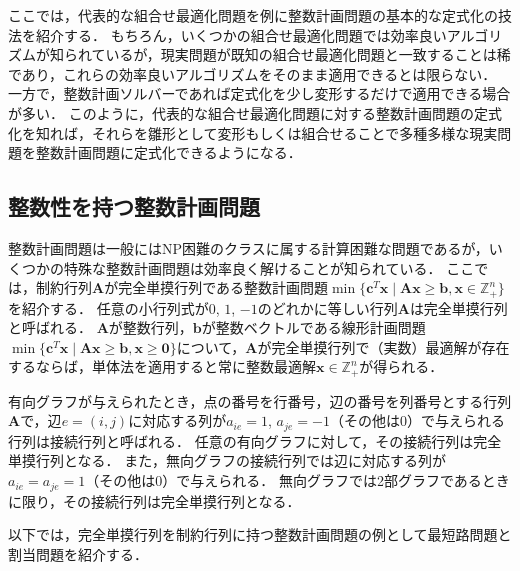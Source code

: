 \documentclass[japanese]{jnlp_1.4}
\begin{document}
ここでは，代表的な組合せ最適化問題を例に整数計画問題の基本的な定式化の技法を紹介する．
もちろん，いくつかの組合せ最適化問題では効率良いアルゴリズムが知られているが，現実問題が既知の組合せ最適化問題と一致することは稀であり，これらの効率良いアルゴリズムをそのまま適用できるとは限らない．
一方で，整数計画ソルバーであれば定式化を少し変形するだけで適用できる場合が多い．
このように，代表的な組合せ最適化問題に対する整数計画問題の定式化を知れば，それらを雛形として変形もしくは組合せることで多種多様な現実問題を整数計画問題に定式化できるようになる．


\subsection{整数性を持つ整数計画問題}
\label{sec:unimodular}

整数計画問題は一般にはNP困難のクラスに属する計算困難な問題であるが，いくつかの特殊な整数計画問題は効率良く解けることが知られている．
ここでは，制約行列$\bm{A}$が完全単摸行列である整数計画問題$\min\{ \bm{c}^T \bm{x} \mid \bm{A} \bm{x} \ge \bm{b}, \bm{x} \in \mathbb{Z}_+^n \}$を紹介する．
任意の小行列式が$0$, $1$, $-1$のどれかに等しい行列$\bm{A}$は完全単摸行列と呼ばれる．
$\bm{A}$が整数行列，$\bm{b}$が整数ベクトルである線形計画問題$\min\{ \bm{c}^T \bm{x} \mid \bm{A} \bm{x} \ge \bm{b}, \bm{x} \ge \bm{0} \}$について，$\bm{A}$が完全単摸行列で（実数）最適解が存在するならば，単体法を適用すると常に整数最適解$\bm{x} \in \mathbb{Z}_+^n$が得られる．

有向グラフが与えられたとき，点の番号を行番号，辺の番号を列番号とする行列$\bm{A}$で，辺$e = (i,j)$に対応する列が$a_{ie}=1$, $a_{je}=-1$（その他は0）で与えられる行列は接続行列と呼ばれる．
任意の有向グラフに対して，その接続行列は完全単摸行列となる．
また，無向グラフの接続行列では辺に対応する列が$a_{ie} = a_{je} = 1$（その他は0）で与えられる．
無向グラフでは2部グラフであるときに限り，その接続行列は完全単摸行列となる．

以下では，完全単摸行列を制約行列に持つ整数計画問題の例として最短路問題と割当問題を紹介する．
\end{document}
